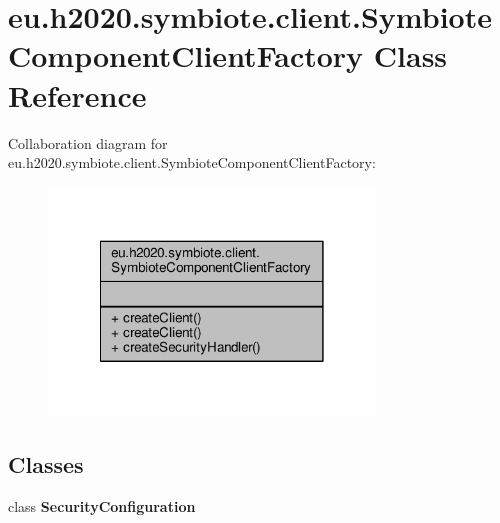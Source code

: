 \hypertarget{classeu_1_1h2020_1_1symbiote_1_1client_1_1SymbioteComponentClientFactory}{}\section{eu.\+h2020.\+symbiote.\+client.\+Symbiote\+Component\+Client\+Factory Class Reference}
\label{classeu_1_1h2020_1_1symbiote_1_1client_1_1SymbioteComponentClientFactory}


Collaboration diagram for eu.\+h2020.\+symbiote.\+client.\+Symbiote\+Component\+Client\+Factory\+:
\nopagebreak
\begin{figure}[H]
\begin{center}
\leavevmode
\includegraphics[width=246pt]{classeu_1_1h2020_1_1symbiote_1_1client_1_1SymbioteComponentClientFactory__coll__graph}
\end{center}
\end{figure}
\subsection*{Classes}
\begin{DoxyCompactItemize}
\item 
class {\bfseries Security\+Configuration}
\end{DoxyCompactItemize}
